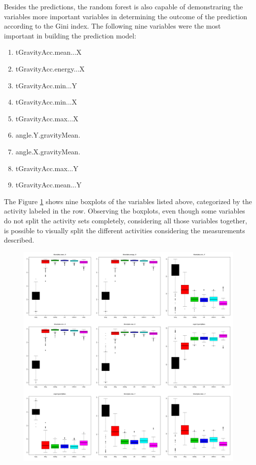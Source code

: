 \documentclass[IEEEtran]{IEEEtran}
\begin{document}
Besides the predictions, the random forest is also capable of demonstraring the
variables more important variables in determining the outcome of the prediction
according to the Gini index. The following nine variables were the most important
in building the prediction model:

\begin{enumerate}
    \item tGravityAcc.mean...X
    \item tGravityAcc.energy...X
    \item tGravityAcc.min...Y
    \item tGravityAcc.min...X
    \item tGravityAcc.max...X
    \item angle.Y.gravityMean.
    \item angle.X.gravityMean.
    \item tGravityAcc.max...Y
    \item tGravityAcc.mean...Y
\end{enumerate}

The Figure \ref{fig:boxplots} shows nine boxplots of the variables listed
above, categorized by the activity labeled in the row. Observing the boxplots,
even though some variables do not split the activity sets completely,
considering all those variables together, is possible to visually split the
different activities considering the measurements described.

\begin{figure}[ht]
    \centering
    \includegraphics[width=16cm]{img/plots.png}
    \caption{}
    \label{fig:boxplots}
\end{figure}
\end{document}
